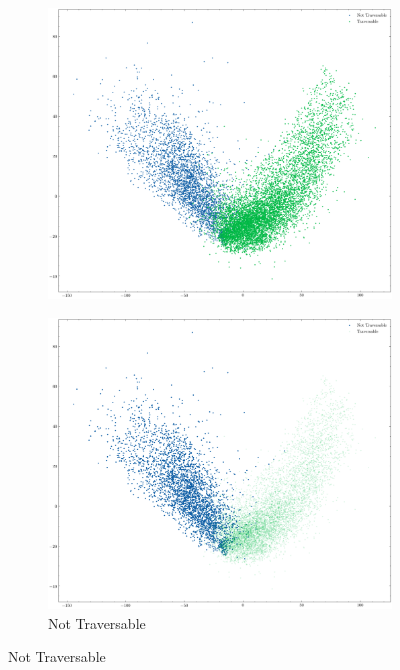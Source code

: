 \documentclass[../document.tex]{subfiles}
\begin{document}
\begin{figure} [htbp]
    \centering
    \begin{subfigure}[b]{1\textwidth}
        \includegraphics[width=\linewidth]{../img/5/pca/pca.png}
    \end{subfigure}
    \begin{subfigure}[b]{0.48\textwidth}
        \includegraphics[width=\linewidth]{../img/5/pca/pca-0.png}
        \caption{Not Traversable}
    \end{subfigure}

\end{figure}
\end{document}
